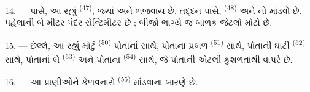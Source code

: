 14. --- પાસે, આ રહ્યું  \textsuperscript{(47)},
જ્યાં  અને  ભજવાય છે. તદ્દન પાસે,
 \textsuperscript{(48)} અને નો માંડવો છે.
પહેલાની  બે મીટર પંદર સેન્ટિમીટર છે ; બીજો ભાગ્યે જ
બાળક જેટલો મોટો છે.

15. --- છેલ્લે, આ રહ્યું મોટું 
\textsuperscript{(50)} પોતાનાં  સાથે, પોતાના
પ્રબળ   \textsuperscript{(51)} સાથે,
પોતાની ઘાટી   \textsuperscript{(52)}
સાથે, પોતાનાં બે  \textsuperscript{(53)} અને પોતાના
 \textsuperscript{(54)} સાથે, જે પોતાની  એટલી
કુશળતાથી વાપરે છે.

16. --- આ પ્રાણીઓને કેળવનારો  \textsuperscript{(55)}
માંડવાના બારણે છે.

\VUsaut{6.0mm}
\VUfilet{22mm}
